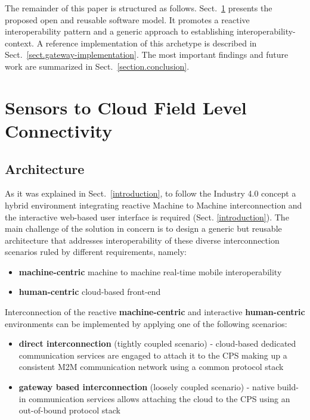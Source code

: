 \documentclass[runningheads]{llncs}
\begin{document}
The remainder of this paper is structured as follows. Sect.~\ref{cloud-to-sensors-field-level-connectivity} presents the proposed open and reusable software model. It promotes a reactive interoperability pattern and a generic approach to establishing interoperability-context. A reference implementation of this archetype is described in Sect.~\ref{sect.gateway-implementation}. The most important findings and future work are summarized in Sect.~\ref{section.conclusion}.

\section{Sensors to Cloud Field Level Connectivity}\label{cloud-to-sensors-field-level-connectivity}

\subsection{Architecture}\label{subs.architecture}

As it was explained in Sect.~\ref{introduction}, to follow the Industry 4.0 concept a hybrid environment integrating reactive Machine to Machine interconnection and the interactive web-based user interface is required (Sect. \ref{introduction}). The main challenge of the solution in concern is to design a generic but reusable architecture that addresses interoperability of these diverse interconnection scenarios ruled by different requirements, namely:

\begin{itemize}
      \item \textbf{machine-centric} machine to machine real-time mobile interoperability
      \item \textbf{human-centric} cloud-based front-end
\end{itemize}

Interconnection of the reactive \textbf{machine-centric} and interactive \textbf{human-centric} environments can be implemented by applying one of the following scenarios:

\begin{itemize}
      \item \textbf{direct interconnection} (tightly coupled scenario) - cloud-based dedicated communication services are engaged to attach it to the CPS making up a consistent M2M communication network using a common protocol stack
      \item \textbf{gateway based interconnection} (loosely coupled scenario) - native build-in communication services allows attaching the cloud to the CPS using an out-of-bound protocol stack
\end{itemize}
\end{document}
